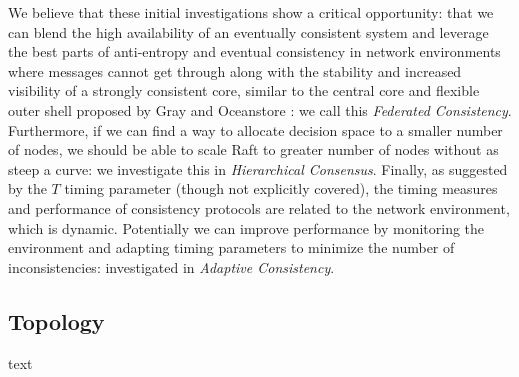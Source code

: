 \documentclass{article}
\begin{document}
We believe that these initial investigations show a critical opportunity: that we can blend the high availability of an eventually consistent system and leverage the best parts of anti-entropy and eventual consistency in network environments where messages cannot get through along with the stability and increased visibility of a strongly consistent core, similar to the central core and flexible outer shell proposed by Gray and Oceanstore \cite{gray_dangers_1996,kubiatowicz_oceanstore:_2000}: we call this \textit{Federated Consistency}. Furthermore, if we can find a way to allocate decision space to a smaller number of nodes, we should be able to scale Raft to greater number of nodes without as steep a curve: we investigate this in \textit{Hierarchical Consensus}. Finally, as suggested by the $T$ timing parameter (though not explicitly covered), the timing measures and performance of consistency protocols are related to the network environment, which is dynamic. Potentially we can improve performance by monitoring the environment and adapting timing parameters to minimize the number of inconsistencies: investigated in \textit{Adaptive Consistency}. 

\subsection{Topology}

text
\end{document}
